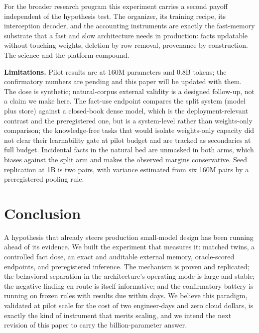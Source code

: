 \documentclass[11pt]{article}
\begin{document}
For the broader research program this experiment carries a second payoff
independent of the hypothesis test. The organizer, its training recipe,
its interception decoder, and the accounting instruments are exactly the
fast-memory substrate that a fast and slow architecture needs in
production: facts updatable without touching weights, deletion by row
removal, provenance by construction. The science and the platform
compound.

\textbf{Limitations.} Pilot results are at 160M parameters and 0.8B
tokens; the confirmatory numbers are pending and this paper will be
updated with them. The dose is synthetic; natural-corpus external
validity is a designed follow-up, not a claim we make here. The fact-use
endpoint compares the split system (model plus store) against a
closed-book dense model, which is the deployment-relevant contrast and
the preregistered one, but is a system-level rather than weights-only
comparison; the knowledge-free tasks that would isolate weights-only
capacity did not clear their learnability gate at pilot budget and are
tracked as secondaries at full budget. Incidental facts in the natural
bed are unmasked in both arms, which biases against the split arm and
makes the observed margins conservative. Seed replication at 1B is two
pairs, with variance estimated from six 160M pairs by a preregistered
pooling rule.

\section{Conclusion}

A hypothesis that already steers production small-model design has been
running ahead of its evidence. We built the experiment that measures it:
matched twins, a controlled fact dose, an exact and auditable external
memory, oracle-scored endpoints, and preregistered inference. The
mechanism is proven and replicated; the behavioral separation in the
architecture's operating mode is large and stable; the negative finding
en route is itself informative; and the confirmatory battery is running
on frozen rules with results due within days. We believe this paradigm,
validated at pilot scale for the cost of two engineer-days and zero cloud
dollars, is exactly the kind of instrument that merits scaling, and we
intend the next revision of this paper to carry the billion-parameter
answer.
\end{document}
